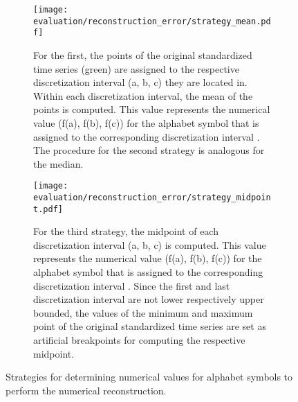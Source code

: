 \begin{figure}
\centering
\begin{subfigure}[t]{0.45\textwidth}
\texttt{[image: evaluation/reconstruction\_error/strategy\_mean.pdf]}
\caption{For the first, the points of the original standardized time series (green) are assigned to the respective discretization interval (a, b, c) they are located in. Within each discretization interval, the mean of the points is computed. This value represents the numerical value (f(a), f(b), f(c)) for the alphabet symbol that is assigned to the corresponding discretization interval \cite{Comparison_SAX}. The procedure for the second strategy is analogous for the median.}
\label{fig:strategy_mean}
\end{subfigure}
\hfill%
\begin{subfigure}[t]{0.45\textwidth}
\texttt{[image: evaluation/reconstruction\_error/strategy\_midpoint.pdf]}
\caption{For the third strategy, the midpoint of each discretization interval (a, b, c) is computed. This value represents the numerical value (f(a), f(b), f(c)) for the alphabet symbol that is assigned to the corresponding discretization interval \cite{Survey_Temporal_Discretization}. Since the first and last discretization interval are not lower respectively upper bounded, the values of the minimum and maximum point of the original standardized time series are set as artificial breakpoints for computing the respective midpoint.}
\label{fig:strategy_midpoint}
\end{subfigure}
\caption[Reconstruction Error - Numerical Values for Alphabet Symbols]{Strategies for determining numerical values for alphabet symbols to perform the numerical reconstruction.}
\label{fig:function_strategies}
\end{figure}
